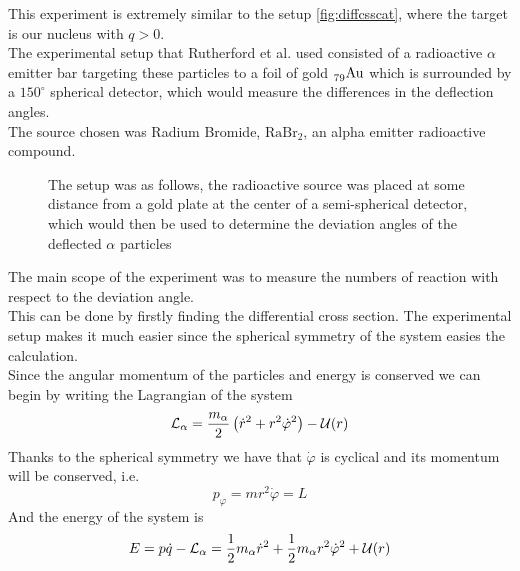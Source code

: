 \documentclass[../qm.tex]{subfiles}
\begin{document}
This experiment is extremely similar to the setup \eqref{fig:diffcsscat}, where the target is our nucleus with $q>0$.\\
The experimental setup that Rutherford et al. used consisted of a radioactive $\alpha$ emitter bar targeting these particles to a foil of gold $\nuc{Au}{}{79}$ which is surrounded by a $150^\circ$ spherical detector, which would measure the differences in the deflection angles.\\
The source chosen was Radium Bromide, $\mathrm{RaBr_2}$, an alpha emitter radioactive compound.
\begin{figure}[H]
	\centering
	\caption{The setup was as follows, the radioactive source was placed at some distance from a gold plate at the center of a semi-spherical detector, which would then be used to determine the deviation angles of the deflected $\alpha$ particles}
	\label{fig:rutherfordsetup}
\end{figure}
The main scope of the experiment was to measure the numbers of reaction with respect to the deviation angle.\\
This can be done by firstly finding the differential cross section. The experimental setup makes it much easier since the spherical symmetry of the system easies the calculation.\\
Since the angular momentum of the particles and energy is conserved we can begin by writing the Lagrangian of the system
\begin{equation}
	\lag_\alpha=\frac{m_\alpha}{2}\left( \dot{r}^2+r^2\dot{\varphi}^2 \right)-\pot(r)
	\label{eq:rutherfordlag}
\end{equation}
Thanks to the spherical symmetry we have that $\dot{\varphi}$ is cyclical and its momentum will be conserved, i.e.
\begin{equation*}
	p_\varphi=mr^2\dot{\varphi}=L
\end{equation*}
And the energy of the system is
\begin{equation*}
	E=p\dot{q}-\lag_\alpha=\frac{1}{2}m_\alpha\dot{r}^2+\frac{1}{2}m_\alpha r^2\dot{\varphi}^2+\pot(r)
\end{equation*}
\end{document}
